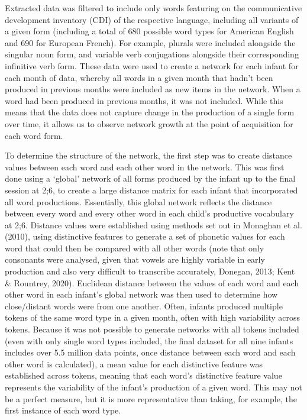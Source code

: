 \documentclass[
  man]{apa6}
\begin{document}
Extracted data was filtered to include only words featuring on the communicative development inventory (CDI) of the respective language, including all variants of a given form (including a total of 680 possible word types for American English and 690 for European French). For example, plurals were included alongside the singular noun form, and variable verb conjugations alongside their corresponding infinitive verb form. These data were used to create a network for each infant for each month of data, whereby all words in a given month that hadn't been produced in previous months were included as new items in the network. When a word had been produced in previous months, it was not included. While this means that the data does not capture change in the production of a single form over time, it allows us to observe network growth at the point of acquisition for each word form.

To determine the structure of the network, the first step was to create distance values between each word and each other word in the network. This was first done using a `global' network of all forms produced by the infant up to the final session at 2;6, to create a large distance matrix for each infant that incorporated all word productions. Essentially, this global network reflects the distance between every word and every other word in each child's productive vocabulary at 2;6. Distance values were established using methods set out in Monaghan et al. (2010), using distinctive features to generate a set of phonetic values for each word that could then be compared with all other words (note that only consonants were analysed, given that vowels are highly variable in early production and also very difficult to transcribe accurately, Donegan, 2013; Kent \& Rountrey, 2020). Euclidean distance between the values of each word and each other word in each infant's global network was then used to determine how close/distant words were from one another. Often, infants produced multiple tokens of the same word type in a given month, often with high variability across tokens. Because it was not possible to generate networks with all tokens included (even with only single word types included, the final dataset for all nine infants includes over 5.5 million data points, once distance between each word and each other word is calculated), a mean value for each distinctive feature was established across tokens, meaning that each word's distinctive feature value represents the variability of the infant's production of a given word. This may not be a perfect measure, but it is more representative than taking, for example, the first instance of each word type.
\end{document}
